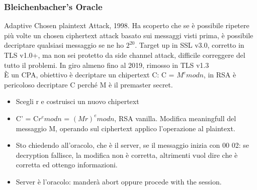 \documentclass[16px]{article}
\begin{document}
\subsubsection{Bleichenbacher's Oracle}
Adaptive Chosen plaintext Attack, 1998. Ha scoperto che se è possibile ripetere più
volte un chosen ciphertext attack basato sui messaggi visti prima, è possibile decriptare qualsiasi messaggio se ne ho $2^{20}$. Target up in SSL v3.0, corretto in TLS v1.0+, ma non sei protetto da side channel attack, difficile correggere del tutto il problemi. In giro almeno fino al 2019, rimosso in TLS v1.3\\ È un CPA, obiettivo è decriptare un chipertext C: C = $M^emodn$, in RSA è pericoloso decriptare C perché M è il premaster secret.\\ 
\begin{itemize}
\item Scegli r e costruisci un nuovo chipertext
\item C' = C$r^emodn$ = $(Mr)^emodn$, RSA vanilla. Modifica meaningfull del messaggio M, operando sul ciphertext applico l'operazione al plaintext.
\item Sto chiedendo all'oracolo, che è il server, se il messaggio inizia con 00 02: se decryption fallisce, la modifica non è corretta, altrimenti vuol dire che è corretta ed ottengo informazioni.
\item Server è l'oracolo: manderà abort oppure procede with the session.
\end{itemize}
\end{document}

